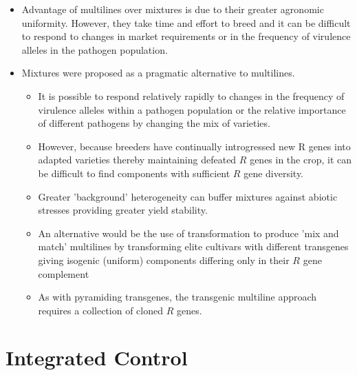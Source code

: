 \documentclass[11pt,dvipsnames,ignorenonframetext,aspectratio=169]{beamer}
\providecommand{\tightlist}{%
  \setlength{\itemsep}{0pt}\setlength{\parskip}{0pt}}
\begin{document}
\begin{frame}{}
\protect\hypertarget{section-8}{}
\small

\begin{itemize}
\tightlist
\item
  Advantage of multilines over mixtures is due to their greater
  agronomic uniformity. However, they take time and effort to breed and
  it can be difficult to respond to changes in market requirements or in
  the frequency of virulence alleles in the pathogen population.
\item
  Mixtures were proposed as a pragmatic alternative to multilines.

  \begin{itemize}
  \footnotesize
  \item It is possible to respond relatively rapidly to changes in the frequency of virulence alleles within a pathogen population or the relative importance of different pathogens by changing the mix of varieties.
  \item However, because breeders have continually introgressed new R genes into adapted varieties thereby maintaining defeated $R$ genes in the crop, it can be difficult to find components with sufficient $R$ gene diversity.
  \item Greater 'background' heterogeneity can buffer mixtures against abiotic stresses providing greater yield stability.
  \item An alternative would be the use of transformation to produce 'mix and match' multilines by transforming elite cultivars with different transgenes giving isogenic (uniform) components differing only in their $R$ gene complement
  \item As with pyramiding transgenes, the transgenic multiline approach requires a collection of cloned $R$ genes.
  \end{itemize}
\end{itemize}
\end{frame}

\hypertarget{integrated-control}{%
\section{Integrated Control}\label{integrated-control}}
\end{document}
